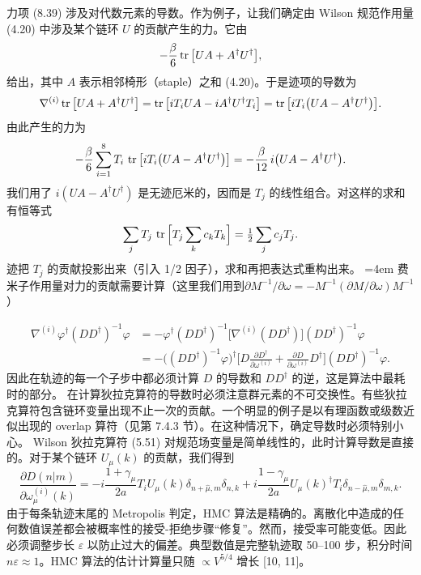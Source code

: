 力项 (8.39) 涉及对代数元素的导数。作为例子，让我们确定由 Wilson 规范作用量 (4.20) 中涉及某个链环 $U$ 的贡献产生的力。它由
\begin{equation}
-\frac{\beta}{6}\operatorname{tr}\big[UA + A^\dagger U^\dagger\big],
\end{equation}
给出，其中 $A$ 表示相邻椅形（staple）之和 (4.20)。于是迹项的导数为
\begin{equation}
\nabla^{(i)}\operatorname{tr}\big[UA + A^\dagger U^\dagger\big]
= \operatorname{tr}\big[iT_iUA - iA^\dagger U^\dagger T_i\big]
= \operatorname{tr}\big[iT_i\big(UA - A^\dagger U^\dagger\big)\big].
\end{equation}
由此产生的力为
\begin{equation}
-\frac{\beta}{6}\sum_{i=1}^{8}T_i\,\operatorname{tr}\big[iT_i\big(UA - A^\dagger U^\dagger\big)\big]
= -\frac{\beta}{12}\,i\big(UA - A^\dagger U^\dagger\big).
\end{equation}
我们用了 $i(UA - A^\dagger U^\dagger)$ 是无迹厄米的，因而是 $T_j$ 的线性组合。对这样的求和有恒等式
\begin{equation}
\sum_j T_j\,\operatorname{tr}\Big[T_j\sum_k c_k T_k\Big] = \tfrac{1}{2}\sum_j c_j T_j.
\end{equation}
迹把 $T_j$ 的贡献投影出来（引入 1/2 因子），求和再把表达式重构出来。
\begingroup\emergencystretch=4em 费米子作用量对力的贡献需要计算（这里我们用到\linebreak[0] $\partial M^{-1}/\partial\omega \allowbreak = \allowbreak -M^{-1}(\partial M/\partial\omega)M^{-1}$）\par\endgroup
\begin{equation}
\begin{split}
\nabla^{(i)}\varphi^\dagger(DD^\dagger)^{-1}\varphi
&= -\varphi^\dagger(DD^\dagger)^{-1}\big[\nabla^{(i)}(DD^\dagger)\big](DD^\dagger)^{-1}\varphi \\
&= -\Big((DD^\dagger)^{-1}\varphi\Big)^\dagger
   \Big[D\frac{\partial D^\dagger}{\partial\omega^{(i)}}
   + \frac{\partial D}{\partial\omega^{(i)}}D^\dagger\Big](DD^\dagger)^{-1}\varphi .
\end{split}
\end{equation}
因此在轨迹的每一个子步中都必须计算 $D$ 的导数和 $DD^\dagger$ 的逆，这是算法中最耗时的部分。
在计算狄拉克算符的导数时必须注意群元素的不可交换性。有些狄拉克算符包含链环变量出现不止一次的贡献。一个明显的例子是以有理函数或级数近似出现的 overlap 算符（见第 7.4.3 节）。在这种情况下，确定导数时必须特别小心。
Wilson 狄拉克算符 (5.51) 对规范场变量是简单线性的，此时计算导数是直接的。对于某个链环 $U_\mu(k)$ 的贡献，我们得到
\begin{equation}
\frac{\partial D(n|m)}{\partial\omega_\mu^{(i)}(k)}
= -i\frac{1+\gamma_\mu}{2a}T_iU_\mu(k)\delta_{n+\hat{\mu},m}\delta_{n,k}
  + i\frac{1-\gamma_\mu}{2a}U_\mu(k)^\dagger T_i\delta_{n-\hat{\mu},m}\delta_{m,k}.
\end{equation}
由于每条轨迹末尾的 Metropolis 判定，HMC 算法是精确的。离散化中造成的任何数值误差都会被概率性的接受-拒绝步骤``修复''。然而，接受率可能变低。因此必须调整步长 $\varepsilon$ 以防止过大的偏差。典型数值是完整轨迹取 50--100 步，积分时间 $n\varepsilon \approx 1$。HMC 算法的估计计算量只随 $\propto V^{5/4}$ 增长 [10, 11]。

